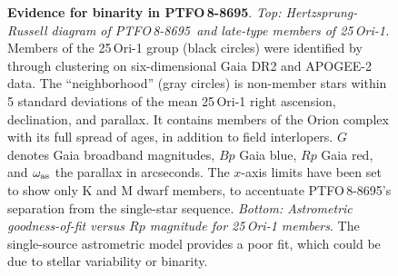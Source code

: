 \documentclass[12pt,twocolumn,tighten]{aastex62}
\newcommand{\ptfo}{PTFO$\,$8-8695}
\begin{document}
\begin{figure}[t]
	\begin{center}
		\leavevmode
		
		\vspace{-0.7cm}
	\end{center}
	\vspace{-0.7cm}
	\caption{ {\bf Evidence for binarity in \ptfo}.
		{\it Top: Hertzsprung-Russell diagram of \ptfo\ and late-type
			members of 25$\,$Ori-1.}
		Members of the 25$\,$Ori-1 group (black circles) were identified by
		\citet{kounkel_apogee2_2018} through clustering on six-dimensional
		Gaia DR2 and APOGEE-2 data.  The ``neighborhood'' (gray
		circles) is non-member
		stars within 5 standard deviations of the mean 25$\,$Ori-1 right
		ascension, declination, and parallax.  It contains members of the
		Orion complex with its full spread of ages, in addition to field
		interlopers.  $G$ denotes Gaia broadband magnitudes, $Bp$ Gaia blue, $Rp$
		Gaia red, and $\omega_{\rm as}$ the parallax in arcseconds.  The
		$x$-axis limits have been set to show only K and M dwarf members, to
		accentuate \ptfo's separation from the single-star sequence.
		{\it Bottom: Astrometric goodness-of-fit versus $Rp$ magnitude
			for 25$\,$Ori-1 members}.
		The single-source astrometric model provides a poor fit, which
		could be due to stellar variability or binarity.
		\label{fig:gaia}
	}
\end{figure}
\end{document}
